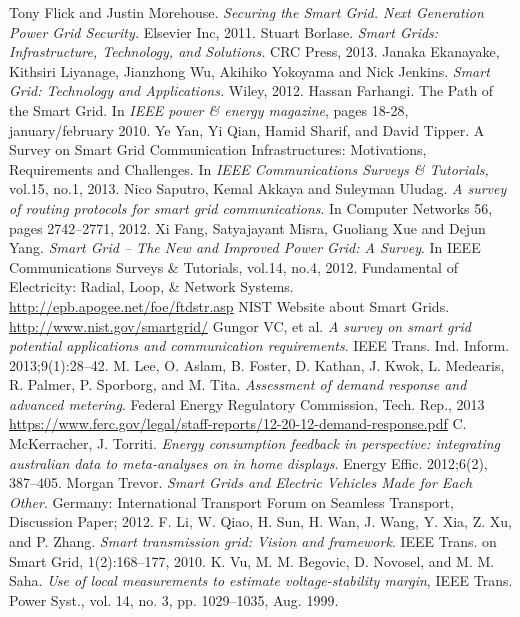 \documentclass[11pt,oneside]{book}
\begin{document}
\begin{thebibliography}{99}
 Tony Flick and Justin Morehouse. \emph{Securing the Smart Grid. Next Generation Power Grid Security.} Elsevier Inc, 2011.
 Stuart Borlase. \emph{Smart Grids: Infrastructure, Technology, and Solutions.} CRC Press, 2013.
 Janaka Ekanayake, Kithsiri Liyanage, Jianzhong Wu, Akihiko Yokoyama and Nick Jenkins. \emph{Smart Grid: Technology and Applications.} Wiley, 2012.
 Hassan Farhangi. The Path of the Smart Grid. In \emph{IEEE power \& energy magazine}, pages 18-28, january/february 2010.
 Ye Yan, Yi Qian, Hamid Sharif, and David Tipper. A Survey on Smart Grid Communication Infrastructures: Motivations, Requirements and Challenges. In \emph{IEEE Communications Surveys \& Tutorials,} vol.15, no.1, 2013.
 Nico Saputro, Kemal Akkaya and Suleyman Uludag. \emph{A survey of routing protocols for smart grid communications}. In Computer Networks 56, pages 2742–2771, 2012.
 Xi Fang, Satyajayant Misra, Guoliang Xue and Dejun Yang. \emph{Smart Grid – The New and Improved Power Grid: A Survey}. In IEEE Communications Surveys \& Tutorials, vol.14, no.4, 2012.
 Fundamental of Electricity: Radial, Loop, \& Network Systems. \url{http://epb.apogee.net/foe/ftdstr.asp}
 NIST Website about Smart Grids. \url{http://www.nist.gov/smartgrid/}
 Gungor VC, et al. \emph{A survey on smart grid potential applications and
communication requirements}. IEEE Trans. Ind. Inform. 2013;9(1):28–42.
 M. Lee, O. Aslam, B. Foster, D. Kathan, J. Kwok, L. Medearis,
R. Palmer, P. Sporborg, and M. Tita. \emph{Assessment of demand response
and advanced metering}. Federal Energy Regulatory Commission, Tech. Rep., 2013 \url{https://www.ferc.gov/legal/staff-reports/12-20-12-demand-response.pdf}
 C. McKerracher, J. Torriti. \emph{Energy consumption feedback in perspective: integrating australian data to meta-analyses on in home displays}. Energy Effic. 2012;6(2), 387–405.
 Morgan Trevor. \emph{Smart Grids and Electric Vehicles Made for Each Other}. Germany: International Transport Forum on Seamless Transport, Discussion Paper; 2012.
 F. Li, W. Qiao, H. Sun, H. Wan, J. Wang, Y. Xia, Z. Xu, and P. Zhang.
\emph{Smart transmission grid: Vision and framework}. IEEE Trans. on Smart Grid, 1(2):168–177, 2010.
 K. Vu, M. M. Begovic, D. Novosel, and M. M. Saha. \emph{Use of local measurements to estimate voltage-stability margin}, IEEE Trans. Power Syst., vol. 14, no. 3, pp. 1029–1035, Aug. 1999. 

\end{thebibliography}
\end{document}
